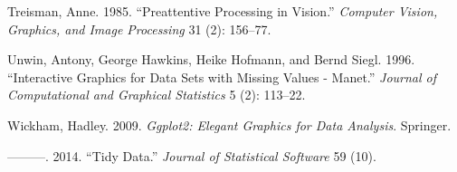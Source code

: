 \documentclass[]{article}
\begin{document}
\hypertarget{ref-treisman1985}{}
Treisman, Anne. 1985. ``Preattentive Processing in Vision.''
\emph{Computer Vision, Graphics, and Image Processing} 31 (2): 156--77.

\hypertarget{ref-Unwin1996}{}
Unwin, Antony, George Hawkins, Heike Hofmann, and Bernd Siegl. 1996.
``Interactive Graphics for Data Sets with Missing Values - Manet.''
\emph{Journal of Computational and Graphical Statistics} 5 (2): 113--22.

\hypertarget{ref-wickham2009ggplot2}{}
Wickham, Hadley. 2009. \emph{Ggplot2: Elegant Graphics for Data
Analysis}. Springer.

\hypertarget{ref-wickham2014}{}
---------. 2014. ``Tidy Data.'' \emph{Journal of Statistical Software}
59 (10).
\end{document}
